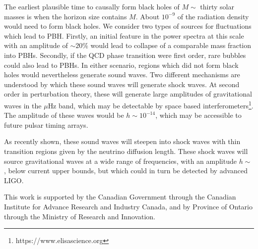 \documentclass[aps,showpacs,twocolumn,floats,prd,superscriptaddress,nofootinbib]{revtex4}
\begin{document}
The earliest plausible time to causally form black holes of $M\sim$
thirty solar masses is when the horizon size contains $M$.  About
$10^{-9}$ of the radiation density would need to form black holes.  We
consider two types of sources for fluctuations which lead to PBH.
Firstly, an initial feature in the power spectra at this scale with an
amplitude of $\sim 20\%$ would lead to collapse of a comparable mass
fraction into PBHs\cite{Kühnel2016}.  Secondly, if the QCD phase
transition were first order, rare bubbles could also lead to PBHs.  In
either scenario, regions which did not form black holes would
nevertheless generate sound waves.  Two different mechanisms are
understood by which these sound waves will generate shock waves.  At
second order in perturbation theory, these will generate large
amplitudes of gravitational waves in the $\mu$Hz
band\cite{2007PhRvD..76h4019B}, which may be detectable by space based
interferometers\footnote{https://www.elisascience.org}.  The amplitude
of these waves would be $h \sim 10^{-14}$, which may be accessible to
future pulsar timing arrays\cite{kramer04}.

As recently shown\cite{2015arXiv151002985P}, these sound waves will
steepen into shock waves with thin transition regions given by the
neutrino diffusion length\cite{2014PhRvL.113f1301J}.  These shock
waves will source gravitational waves at a wide range of frequencies,
with an amplitude $h\sim$, below current upper
bounds\cite{2015PhRvD..91b2003A}, but which could in turn be detected
by advanced LIGO.



\acknowledgments


This work is supported by the Canadian Government through the Canadian
Institute for Advance Research and Industry Canada, and by Province of
Ontario through the Ministry of Research and Innovation.

\appendix

%

\end{document}
